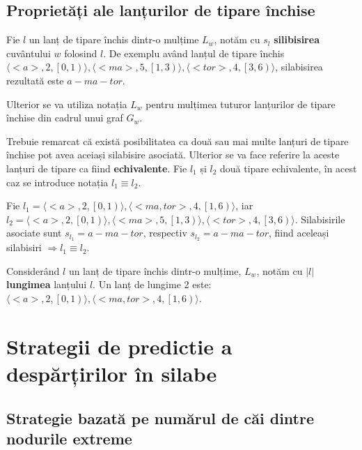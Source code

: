\subsection{Proprietăți ale lanțurilor de tipare închise}

\begin{defi}
Fie $l$ un lanț de tipare închis dintr-o mulțime $L_w$, notăm cu $s_{l}$ \textbf{silibisirea} cuvântului $w$ folosind $l$. De exemplu având lanțul de tipare închis $\langle <a>, 2, \left[ 0, 1 \right)\rangle, \langle <ma>, 5, \left[ 1, 3 \right)\rangle, \langle <tor>, 4, \left[ 3, 6 \right)\rangle$, silabisirea rezultată este $a-ma-tor$. 
\end{defi}

Ulterior se va utiliza notația $L_w$ pentru mulțimea tuturor lanțurilor de tipare închise din cadrul unui graf $G_w$.

\begin{defi}
Trebuie remarcat că există posibilitatea ca două sau mai multe lanțuri de tipare închise pot avea aceiași silabisire asociată. Ulterior se va face referire la aceste lanțuri de tipare ca fiind \textbf{echivalente}. Fie $l_1$ și $l_2$ două tipare echivalente, în acest caz se introduce notația $l_1 \equiv l_2$.
\end{defi}

\begin{ex}
Fie $l_1 = \langle <a>, 2, \left[ 0, 1 \right)\rangle, \langle <ma, tor>, 4, \left[ 1, 6 \right)\rangle$, iar $l_2 = \langle <a>, 2, \left[ 0, 1 \right)\rangle, \langle <ma>, 5, \left[ 1, 3 \right)\rangle, \langle <tor>, 4, \left[ 3, 6 \right)\rangle$. Silabisirile asociate sunt $s_{l_1} = a-ma-tor$, respectiv $s_{l_2} = a-ma-tor$, fiind aceleași silabisiri $\Rightarrow l_1 \equiv l_2$.
\end{ex}

\begin{defi}
Considerând $l$ un lanț de tipare închis dintr-o mulțime, $L_w$, notăm cu $\vert l \vert $ \textbf{lungimea} lanțului $l$. Un lanț de lungime 2 este: $\langle <a>, 2, \left[ 0, 1 \right)\rangle, \langle <ma, tor>, 4, \left[ 1, 6 \right)\rangle$.
\end{defi}


\section{Strategii de predictie a despărțirilor în silabe}

\subsection{Strategie bazată pe numărul de căi dintre nodurile extreme}

